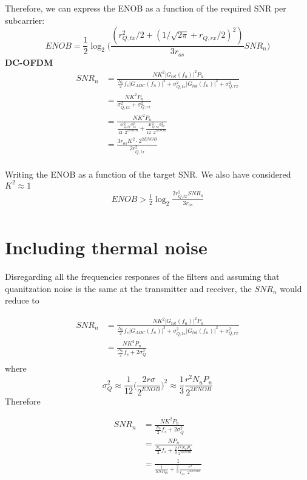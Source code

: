 \documentclass[a4paper]{article}
\begin{document}
Therefore, we can express the ENOB as a function of the required SNR per subcarrier:
\begin{equation}
ENOB = \frac{1}{2}\log_2\bigg(\frac{(r_{Q,tx}^2/2 + (1/\sqrt{2\pi} + r_{Q,rx}/2)^2)}{3r_{os}}SNR_n\bigg)
\end{equation}
\textbf{DC-OFDM}
\begin{align} \nonumber
SNR_n & =  \frac{NK^2|G_{tot}(f_n)|^2P_n}{\frac{N_0}{2}f_s|G_{ADC}(f_n)|^2 + \sigma_{Q,tx}^2|G_{tot}(f_n)|^2 + \sigma_{Q,rx}^2} \\
& = \frac{NK^2P_n}{ \sigma_{Q,tx}^2 + \sigma_{Q,rx}^2} \\
&= \frac{NK^2P_n}{ \frac{4r_{Q,tx}^2\sigma_{tx}^2}{12\cdot 2^{2ENOB}} + \frac{4r_{Q,rx}^2\sigma_{rx}^2}{12\cdot 2^{2ENOB}}} \\
&= \frac{3r_{os}K^2 \cdot 2^{2ENOB}}{2r_{Q,tx}^2} \\
\end{align}

Writing the ENOB as a function of the target SNR. We also have considered $K^2 \approx 1$
\begin{align} \nonumber
ENOB > \frac{1}{2}\log_2\frac{2r_{Q,tx}^2SNR_n}{3r_{os}}  \\
\end{align}

\section{Including thermal noise}

Disregarding all the frequencies responses of the filters and assuming that quanitzation noise is the same at the transmitter and receiver, the $SNR_n$ would reduce to

\begin{align} \nonumber
SNR_n & =  \frac{NK^2|G_{tot}(f_n)|^2P_n}{\frac{N_0}{2}f_s|G_{ADC}(f_n)|^2 + \sigma_{Q,tx}^2|G_{tot}(f_n)|^2 + \sigma_{Q,rx}^2} \\
& =  \frac{NK^2P_n}{\frac{N_0}{2}f_s + 2\sigma_{Q}^2} \\
\end{align}
where \begin{equation}
\sigma_Q^2 \approx \frac{1}{12}\bigg(\frac{2r\sigma}{2^{ENOB}}\bigg)^2 \approx \frac{1}{3}\frac{r^2N_uP_n}{2^{2ENOB}}
\end{equation}
Therefore

\begin{align} \nonumber
SNR_n & =  \frac{NK^2P_n}{\frac{N_0}{2}f_s + 2\sigma_{Q}^2} \\
& =  \frac{NP_n}{\frac{N_0}{2}f_s + \frac{2}{3}\frac{r^2N_uP_n}{2^{2ENOB}}} \\
& =  \frac{1}{\frac{1}{SNR_{th}} + \frac{2}{3}\frac{r^2}{r_{os}\cdot 2^{2ENOB}}} \\
\end{align}
\end{document}
